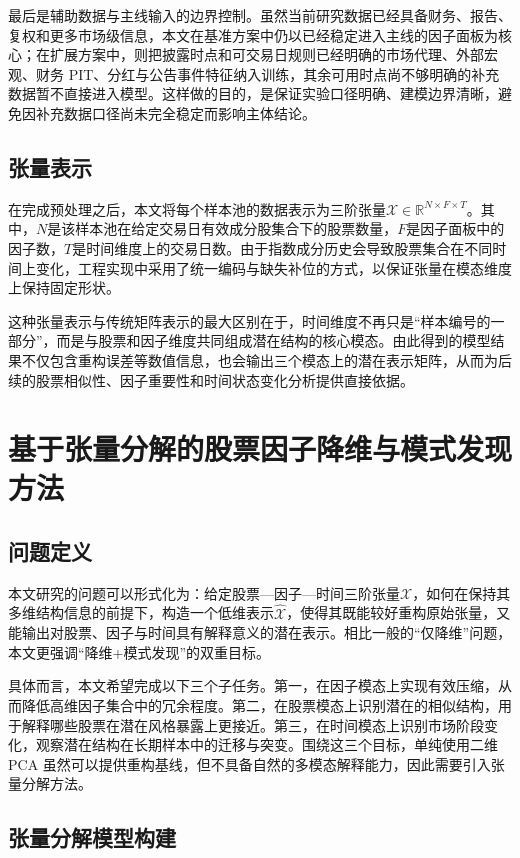 最后是辅助数据与主线输入的边界控制。虽然当前研究数据已经具备财务、报告、复权和更多市场级信息，本文在基准方案中仍以已经稳定进入主线的因子面板为核心；在扩展方案中，则把披露时点和可交易日规则已经明确的市场代理、外部宏观、财务 PIT、分红与公告事件特征纳入训练，其余可用时点尚不够明确的补充数据暂不直接进入模型。这样做的目的，是保证实验口径明确、建模边界清晰，避免因补充数据口径尚未完全稳定而影响主体结论。

\section{张量表示}

在完成预处理之后，本文将每个样本池的数据表示为三阶张量$\mathcal{X}\in\mathbb{R}^{N\times F\times T}$。其中，$N$是该样本池在给定交易日有效成分股集合下的股票数量，$F$是因子面板中的因子数，$T$是时间维度上的交易日数。由于指数成分历史会导致股票集合在不同时间上变化，工程实现中采用了统一编码与缺失补位的方式，以保证张量在模态维度上保持固定形状。

这种张量表示与传统矩阵表示的最大区别在于，时间维度不再只是“样本编号的一部分”，而是与股票和因子维度共同组成潜在结构的核心模态。由此得到的模型结果不仅包含重构误差等数值信息，也会输出三个模态上的潜在表示矩阵，从而为后续的股票相似性、因子重要性和时间状态变化分析提供直接依据。

\chapter{基于张量分解的股票因子降维与模式发现方法}

\section{问题定义}

本文研究的问题可以形式化为：给定股票—因子—时间三阶张量$\mathcal{X}$，如何在保持其多维结构信息的前提下，构造一个低维表示$\hat{\mathcal{X}}$，使得其既能较好重构原始张量，又能输出对股票、因子与时间具有解释意义的潜在表示。相比一般的“仅降维”问题，本文更强调“降维+模式发现”的双重目标。

具体而言，本文希望完成以下三个子任务。第一，在因子模态上实现有效压缩，从而降低高维因子集合中的冗余程度。第二，在股票模态上识别潜在的相似结构，用于解释哪些股票在潜在风格暴露上更接近。第三，在时间模态上识别市场阶段变化，观察潜在结构在长期样本中的迁移与突变。围绕这三个目标，单纯使用二维 PCA 虽然可以提供重构基线，但不具备自然的多模态解释能力，因此需要引入张量分解方法。

\section{张量分解模型构建}

